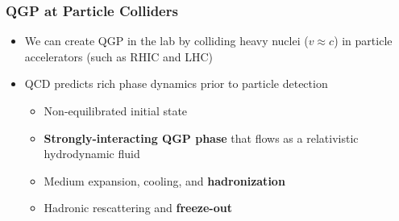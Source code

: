 \begin{frame}
  \frametitle{\textbf{QGP at Particle Colliders}}
  \begin{itemize}
  \item We can create QGP in the lab by colliding heavy nuclei ($v \approx c$) in particle accelerators (such as RHIC and LHC)
  \item QCD predicts rich phase dynamics prior to particle detection
    \begin{itemize}
    \item Non-equilibrated initial state
    \item \textbf{Strongly-interacting QGP phase} that flows as a relativistic hydrodynamic fluid
    \item Medium expansion, cooling, and \textbf{hadronization}
    \item Hadronic rescattering and \textbf{freeze-out}
    \end{itemize}
  \end{itemize}

  \
  
  \centering
\end{frame}
